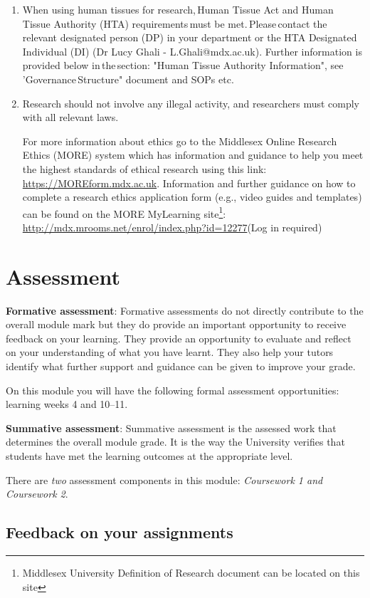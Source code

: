 \documentclass{MDXHandbook}
\begin{document}
{\begin{enumerate}
	\item When using human tissues for research, Human Tissue Act and Human Tissue Authority (HTA) requirements must be met. Please contact the relevant designated person (DP) in your department or the HTA Designated Individual (DI) (Dr Lucy Ghali - L.Ghali@mdx.ac.uk). Further information is provided below in the section: "Human Tissue Authority Information", see 'Governance Structure" document and SOPs etc.  
	\item Research should not involve any illegal activity, and researchers must comply with all relevant laws.

		For more information about ethics go to the Middlesex Online Research Ethics (MORE) system which has information and guidance to help you meet the highest standards of ethical research using this link: \url{https://MOREform.mdx.ac.uk}. Information and further guidance on how to complete a research ethics application form (e.g., video guides and templates) can be found on the MORE MyLearning site\footnote{Middlesex University Definition of Research document can be located on this site}: \url{http://mdx.mrooms.net/enrol/index.php?id=12277}(Log in required) 
\end{enumerate}

\chapter{Assessment}
\textbf{Formative assessment}: Formative assessments do not directly contribute to the overall module mark but they do provide an important opportunity to receive feedback on your learning. They provide an opportunity to evaluate and reflect on your understanding of what you have learnt. They also help your tutors identify what further support and guidance can be given to improve your grade. 

On this module you will have the following formal assessment opportunities: learning weeks 4 and 10\---11.

\textbf{Summative assessment}: Summative assessment is the assessed work that determines the overall module grade. It is the way the University verifies that students have met the learning outcomes at the appropriate level. 

There are \emph{two} assessment components in this module: \emph{Coursework 1 and Coursework 2}.


\section*{Feedback on your assignments}

}
\end{document}
